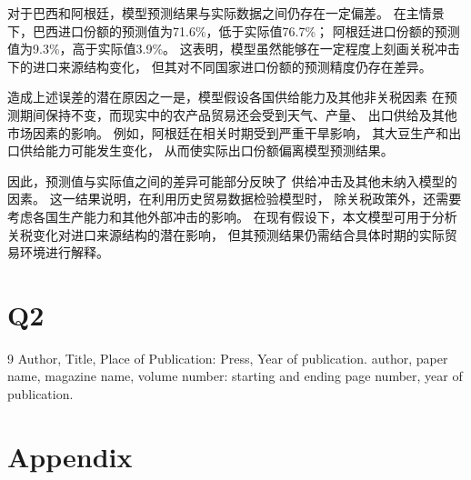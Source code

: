 \documentclass{apmcmthesis}
\begin{document}
对于巴西和阿根廷，模型预测结果与实际数据之间仍存在一定偏差。
在主情景下，巴西进口份额的预测值为71.6\%，低于实际值76.7\%；
阿根廷进口份额的预测值为9.3\%，高于实际值3.9\%。
这表明，模型虽然能够在一定程度上刻画关税冲击下的进口来源结构变化，
但其对不同国家进口份额的预测精度仍存在差异。

造成上述误差的潜在原因之一是，模型假设各国供给能力及其他非关税因素
在预测期间保持不变，而现实中的农产品贸易还会受到天气、产量、
出口供给及其他市场因素的影响。
例如，阿根廷在相关时期受到严重干旱影响，
其大豆生产和出口供给能力可能发生变化，
从而使实际出口份额偏离模型预测结果。

因此，预测值与实际值之间的差异可能部分反映了
供给冲击及其他未纳入模型的因素。
这一结果说明，在利用历史贸易数据检验模型时，
除关税政策外，还需要考虑各国生产能力和其他外部冲击的影响。
在现有假设下，本文模型可用于分析关税变化对进口来源结构的潜在影响，
但其预测结果仍需结合具体时期的实际贸易环境进行解释。

\section{Q2}




\begin{thebibliography}{9}%
 Author, Title, Place of Publication: Press, Year of publication.
 author, paper name, magazine name, volume number: starting and ending
page number, year of publication.
\end{thebibliography}

\newpage

\section{Appendix}
\end{document}
